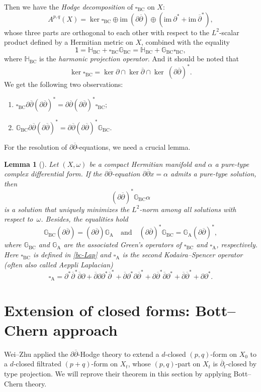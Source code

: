 \documentclass[12pt]{amsart}
\numberwithin{equation}{section}
\newtheorem{lemma}  [theorem]     {Lemma}
\theoremstyle{definition}
\theoremstyle{definition}
\theoremstyle{definition}
\renewcommand{\1}{\mathsf{1}}
\newcommand{\G}{\mathbb{G}}
\newcommand{\db}{\overline{\partial}}
\renewcommand{\>}{\rightarrow}
\newcommand{\p}{\partial}
\newcommand{\bp}{\overline\partial}
\def\p{\partial}
\theoremstyle{plain} %
\theoremstyle{plain} %
\theoremstyle{plain} %
\begin{document}
    Then we have the \textit{Hodge decomposition} of $\square_{\mathrm {BC}}$ on $X$:
	$$\label{bc-hod}
	A^{p,q}(X)=\ker\square_{\mathrm {BC}}\oplus \textrm{im}~(\p\db)
	\oplus(\textrm{im}~\p^*+\textrm{im}~\db^*),
	$$
	whose three parts are orthogonal to each other with respect to the
	$L^2$-scalar product defined by a Hermitian metric on $X$, combined with the equality
	$$\label{identity}
	\1=\mathbb{H}_{\mathrm {BC}}+\square_{\mathrm {BC}}\G_{\mathrm {BC}}=\mathbb{H}_{\mathrm {BC}}+\G_{\mathrm {BC}}\square_{\mathrm {BC}},
	$$
	where $\mathbb{H}_{\mathrm {BC}}$ is the \textit{harmonic projection operator}. And it
	should be noted that
	\begin{equation*}\label{bc-ker}
		\ker\square_{\mathrm {BC}}=\ker\p\cap\ker\db\cap\ker\ (\p\db)^*.
	\end{equation*}
	We get  the following two observations: \begin{enumerate}[(1)]\label{commuate}
		\item \label{case-1}
		$\square_{\mathrm {BC}}\p\db(\p\db)^*=\p\db(\p\db)^*\square_{\mathrm {BC}};$
		\item \label{case-2}
		$\G_{\mathrm {BC}}\p\db(\p\db)^*=\p\db(\p\db)^*\G_{\mathrm {BC}}.$
	\end{enumerate}
	
	For the resolution of $\p\db$-equations, we need a crucial lemma.
	\begin{lemma}[{\cite[Theorem 4.1]{Po15}}]\label{ddbar-eq}
	Let $(X,\omega)$ be a compact Hermitian manifold and $\alpha$ a pure-type complex differential form.
	If the $\p\db$-equation	$\p \db x = \alpha$
	admits a pure-type solution, then
	\[
	(\p\db)^*\G_{\mathrm{BC}}\alpha
	\]
	is a solution that uniquely minimizes the $L^2$-norm among all solutions with respect to~$\omega$.   Besides, the equalities hold
		\[\G_{\mathrm {BC}}(\p\db) = (\p\db) \G_{\mathrm{A}}\quad \text{and} \quad (\p\db)^*\G_{\mathrm {BC}} = \G_{\mathrm{A}}(\p\db)^*,\]
		where $\G_{\mathrm {BC}}$ and $\G_{\mathrm{A}}$ are the associated Green's operators of
		$\square_{\mathrm {BC}}$ and $\square_{\mathrm{A}}$, respectively. Here  $\square_{\mathrm {BC}}$ is defined in \eqref{bc-Lap} and
		$\square_{{\mathrm{A}}}$ is the second
		Kodaira--Spencer operator (often also called Aeppli
		Laplacian)
		$$\square_{{\mathrm{A}}}=\p^*\db^*\db\p+\db\p\p^*\db^*+\db\p^*\p\db^*+\p\db^*\db\p^*+\db\db^*+\p\p^*.$$
	\end{lemma}
	
	
	
	\section{Extension of closed forms: Bott--Chern approach}\label{deformation p,q Bottchern}
	Wei--Zhu \cite{WZ20} applied the $\p\bp$-Hodge theory to extend a $d$-closed $(p,q)$-form on $X_0$ to a $d$-closed filtrated $(p+q)$-form on $X_t$, whose  $(p,q)$-part on $X_t$ is $\bp_{t}$-closed by type projection.  We will reprove their theorem in this section by applying Bott--Chern theory.
\end{document}
